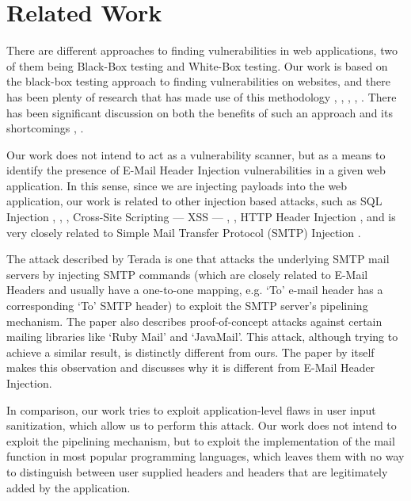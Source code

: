 \section{Related Work}

There are different approaches to finding vulnerabilities in web applications, two of them being Black-Box testing and White-Box testing.
Our work is based on the black-box testing approach to finding vulnerabilities on websites, and there has been plenty of research that has made use of this methodology \cite{Beizer:1995:BTT:202699}, \cite{Huang}, \cite{kals2006secubat}, \cite{payet13:ears-in-the-wild}, \cite{zanero2005automatic}. There has been significant discussion on both the benefits of such an approach \cite{black-box} and its shortcomings \cite{Doupe2012}, \cite{Doupe2010}.

Our work does not intend to act as a vulnerability scanner, but as a means to identify the presence of E-Mail Header Injection vulnerabilities in a given web application. In this sense, since we are injecting payloads into the web application, our work is related to other injection based attacks, such as SQL Injection \cite{sql1}, \cite{sql0}, \cite{sql2}, Cross-Site Scripting --- XSS --- \cite{Injection1}, \cite{KleinAmit}, HTTP Header Injection \cite{sessionride}, and is very closely related to Simple Mail Transfer Protocol (SMTP) Injection \cite{Terada2015}.

The attack described by Terada \cite{Terada2015} is one that attacks the underlying SMTP mail servers by injecting SMTP commands (which are closely related to E-Mail Headers and usually have a one-to-one mapping, e.g. `To' e-mail header has a corresponding `To' SMTP header) to exploit the SMTP server's pipelining mechanism. The paper also describes proof-of-concept attacks against certain mailing libraries like `Ruby Mail' and `JavaMail'. This attack, although trying to achieve a similar result, is distinctly different from ours. The paper by itself makes this observation and discusses why it is different from E-Mail Header Injection.

In comparison, our work tries to exploit application-level flaws in user input sanitization, which allow us to perform this attack. Our work does not intend to exploit the pipelining mechanism, but to exploit the implementation of the mail function in most popular programming languages, which leaves them with no way to distinguish between user supplied headers and headers that are legitimately added by the application.

